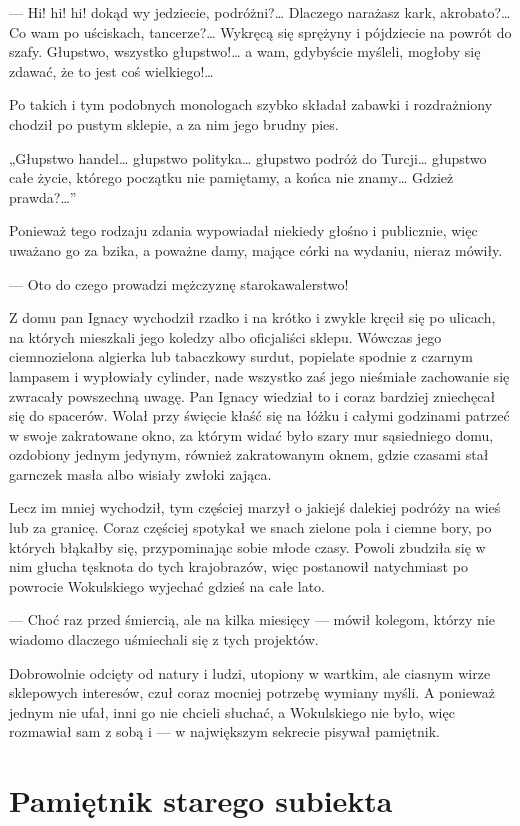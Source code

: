 \documentclass{book}
\begin{document}
— Hi! hi! hi! dokąd wy jedziecie, podróżni?… Dlaczego narażasz kark, akrobato?… Co wam po uściskach, tancerze?… Wykręcą się sprężyny i pójdziecie na powrót do szafy. Głupstwo, wszystko głupstwo!… a wam, gdybyście myśleli, mogłoby się zdawać, że to jest coś wielkiego!…

Po takich i tym podobnych monologach szybko składał zabawki i rozdrażniony chodził po pustym sklepie, a za nim jego brudny pies.

„Głupstwo handel… głupstwo polityka… głupstwo podróż do Turcji… głupstwo całe życie, którego początku nie pamiętamy, a końca nie znamy… Gdzież prawda?…”

Ponieważ tego rodzaju zdania wypowiadał niekiedy głośno i publicznie, więc uważano go za bzika, a poważne damy, mające córki na wydaniu, nieraz mówiły.


— Oto do czego prowadzi mężczyznę starokawalerstwo!

Z domu pan Ignacy wychodził rzadko i na krótko i zwykle kręcił się po ulicach, na których mieszkali jego koledzy albo oficjaliści sklepu. Wówczas jego ciemnozielona algierka lub tabaczkowy surdut, popielate spodnie z czarnym lampasem i wypłowiały cylinder, nade wszystko zaś jego nieśmiałe zachowanie się zwracały powszechną uwagę. Pan Ignacy wiedział to i coraz bardziej zniechęcał się do spacerów. Wolał przy święcie kłaść się na łóżku i całymi godzinami patrzeć w swoje zakratowane okno, za którym widać było szary mur sąsiedniego domu, ozdobiony jednym jedynym, również zakratowanym oknem, gdzie czasami stał garnczek masła albo wisiały zwłoki zająca.

Lecz im mniej wychodził, tym częściej marzył o jakiejś dalekiej podróży na wieś lub za granicę. Coraz częściej spotykał we snach zielone pola i ciemne bory, po których błąkałby się, przypominając sobie młode czasy. Powoli zbudziła się w nim głucha tęsknota do tych krajobrazów, więc postanowił natychmiast po powrocie Wokulskiego wyjechać gdzieś na całe lato.

— Choć raz przed śmiercią, ale na kilka miesięcy — mówił kolegom, którzy nie wiadomo dlaczego uśmiechali się z tych projektów.

Dobrowolnie odcięty od natury i ludzi, utopiony w wartkim, ale ciasnym wirze sklepowych interesów, czuł coraz mocniej potrzebę wymiany myśli. A ponieważ jednym nie ufał, inni go nie chcieli słuchać, a Wokulskiego nie było, więc rozmawiał sam z sobą i — w największym sekrecie pisywał pamiętnik.

\chapter{Pamiętnik starego subiekta}
\end{document}
